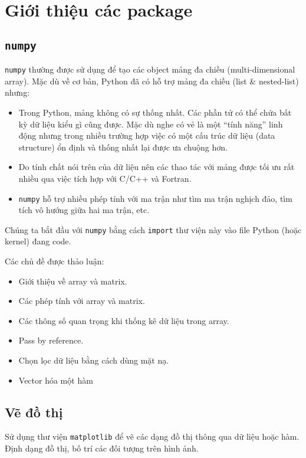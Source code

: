 \documentclass[12pt, a4paper, twoside]{article}
\begin{document}
\section{Giới thiệu các package}
\subsection{\texttt{numpy}}
\texttt{numpy} thường được sử dụng để tạo các object mảng đa chiều (multi-dimensional array). Mặc dù về cơ bản, Python đã có hỗ trợ mảng đa chiều (list \& nested-list) nhưng:
\begin{itemize}
    \item Trong Python, mảng không có sự thống nhất. Các phần tử có thể chứa bất kỳ dữ liệu kiểu gì cũng được. Mặc dù nghe có vẻ là một ``tính năng'' linh động nhưng trong nhiều trường hợp việc có một cấu trúc dữ liệu (data structure) ổn định và thống nhất lại được ưa chuộng hơn.
    \item Do tính chất nói trên của dữ liệu nên các thao tác với mảng được tối ưu rất nhiều qua việc tích hợp với C/C++ và Fortran.
    \item \texttt{numpy} hỗ trợ nhiều phép tính với ma trận như tìm ma trận nghịch đảo, tìm tích vô hướng giữa hai ma trận, etc.
\end{itemize}
Chúng ta bắt đầu với \texttt{numpy} bằng cách \texttt{import} thư viện này vào file Python (hoặc kernel) đang code.

Các chủ đề được thảo luận:
\begin{itemize}
    \item Giới thiệu về array và matrix.
    \item Các phép tính với array và matrix.
    \item Các thông số quan trọng khi thống kê dữ liệu trong array.
    \item Pass by reference.
    \item Chọn lọc dữ liệu bằng cách dùng mặt nạ.
    \item Vector hóa một hàm
\end{itemize}
\subsection{Vẽ đồ thị}
Sử dụng thư viện \texttt{matplotlib} để vẽ các dạng đồ thị thông qua dữ liệu hoặc hàm. Định dạng đồ thị, bố trí các đối tượng trên hình ảnh.
\end{document}
